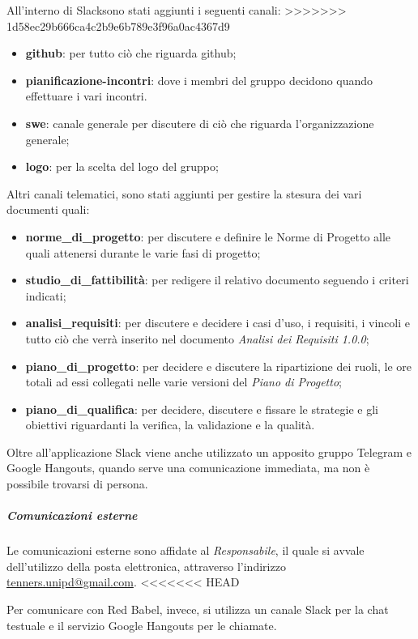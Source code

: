    					All'interno di Slack\glo sono stati aggiunti i seguenti canali:
>>>>>>> 1d58ec29b666ca4c2b9e6b789e3f96a0ac4367d9
   					\begin{itemize}
   						\item \textbf{github}: per tutto ciò che riguarda github;
   						\item \textbf{pianificazione-incontri}: dove i membri del gruppo decidono quando effettuare i vari incontri.
   						\item \textbf{swe}: canale generale per discutere di ciò che riguarda l'organizzazione generale;
   						\item \textbf{logo}: per la scelta del logo del gruppo;

   					\end{itemize}
   					Altri canali telematici, sono stati aggiunti per gestire la stesura dei vari documenti quali:
   					\begin{itemize}
   						\item \textbf{norme\_di\_progetto}: per discutere e definire le Norme di Progetto alle quali attenersi durante le varie fasi di progetto;
   						\item \textbf{studio\_di\_fattibilità}: per redigere il relativo documento seguendo i criteri indicati;
   						\item \textbf{analisi\_requisiti}: per discutere e decidere i casi d'uso, i requisiti, i vincoli e tutto ciò che verrà inserito nel documento \textit{Analisi dei Requisiti 1.0.0};
   						\item \textbf{piano\_di\_progetto}: per decidere e discutere la ripartizione dei ruoli, le ore totali ad essi collegati nelle varie versioni del \textit{Piano di Progetto};
   						\item \textbf{piano\_di\_qualifica}: per decidere, discutere e fissare le strategie e gli obiettivi riguardanti la verifica, la validazione e la qualità.
   					\end{itemize}
   					Oltre all'applicazione Slack viene anche utilizzato un apposito gruppo Telegram e Google Hangouts, quando serve una comunicazione immediata, ma non è possibile trovarsi di persona.
   				\subparagraph{Comunicazioni esterne}
   					Le comunicazioni esterne sono affidate al \textit{Responsabile}, il quale si avvale dell'utilizzo della posta elettronica, attraverso l'indirizzo \href{mailto:tenners.unipd@gmail.com}{tenners.unipd@gmail.com}.
<<<<<<< HEAD
   					
   					Per comunicare con Red Babel, invece, si utilizza un canale Slack per la chat testuale e il servizio Google Hangouts per le chiamate.
   					
